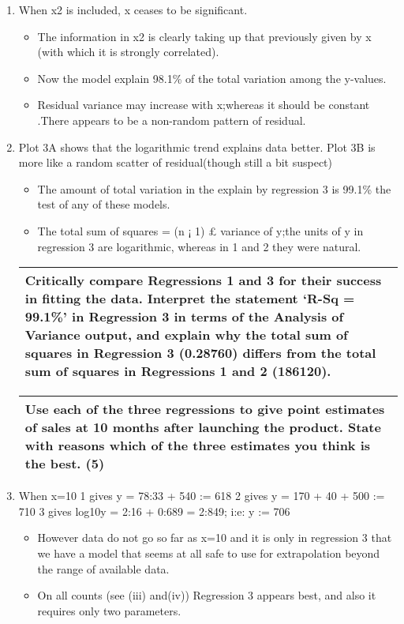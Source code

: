 \documentclass[a4paper,12pt]{article}
\begin{document}
\begin{enumerate}
\item When x2 is included, x ceases to be significant.
\begin{itemize}
    \item The information in x2 is clearly
taking up that previously given by x (with which it is strongly correlated).
\item Now the model
explain 98.1\% of the total variation among the y-values.
\item Residual variance may increase with x;whereas it should be constant .There appears to
be a non-random pattern of residual.
\end{itemize}
\item Plot 3A shows that the logarithmic trend explains data better. Plot 3B is more
like a random scatter of residual(though still a bit suspect)
\begin{itemize}
\item The amount of total variation
in the explain by regression 3 is 99.1\% the test of any of these models.
\item The total sum of squares = (n ¡ 1) £ variance of y;the units of y in regression 3 are
logarithmic, whereas in 1 and 2 they were natural.
\end{itemize}
  \begin{table}[ht!]
     \centering
     \begin{tabular}{|p{15cm}|}
     \hline  
 
Critically compare Regressions 1 and 3 for their success in fitting the data.  Interpret the statement ‘R-Sq = 99.1\%’ in Regression 3 in terms of the Analysis of Variance output, and explain why the total sum of squares in Regression 3 (0.28760) differs from the total sum of squares in Regressions 1 and 2 (186120). 
  \\ \hline
      \end{tabular}
    \end{table}
    
  \begin{table}[ht!]
     \centering
     \begin{tabular}{|p{15cm}|}
     \hline  
 Use each of the three regressions to give point estimates of sales at 10 months after launching the product.  State with reasons which of the three estimates you think is the best. (5)   
 \\ \hline 
      \end{tabular}
    \end{table}
\item When x=10
1 gives y = 78:33 + 540
:=
618
2 gives y = 170 + 40 + 500
:=
710
3 gives log10y = 2:16 + 0:689 = 2:849; i:e: y
:=
706
\begin{itemize}
    \item However data do not go so far as x=10 and it is only in regression 3 that we have a
model that seems at all safe to use for extrapolation beyond the range of available data.
\item On all counts (see (iii) and(iv)) Regression 3 appears best, and also it requires only two
parameters.
\end{itemize}

\end{enumerate}
\end{document}
